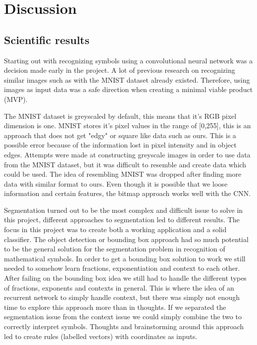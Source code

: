 \chapter{Discussion}

\section{Scientific results}



Starting out with recognizing symbols using a convolutional neural network was a decision made early in the project. A lot of previous research on recognizing similar images such as with the MNIST dataset already existed. Therefore, using images as input data was a safe direction when creating a minimal viable product (MVP).

The MNIST dataset is greyscaled by default, this means that it's RGB pixel dimension is one. MNIST stores it's pixel values in the range of [0,255], this is an approach that does not get "edgy" or square like data such as ours. This is a possible error because of the information lost in pixel intensity and in object edges. Attempts were made at constructing greyscale images in order to use data from the MNIST dataset, but it was difficult to resemble and create data which could be used. The idea of resembling MNIST was dropped after finding more data with similar format to ours. Even though it is possible that we loose information and certain features, the bitmap approach works well with the CNN.

Segmentation turned out to be the most complex and difficult issue to solve in this project, different approaches to segmentation led to different results. The focus in this project was to create both a working application and a solid classifier. The object detection or bounding box approach had so much potential to be the general solution for the segmentation problem in recognition of mathematical symbols. In order to get a bounding box solution to work we still needed to somehow learn fractions, exponentiation and context to each other. After failing on the bounding box idea we still had to handle the different types of fractions, exponents and contexts in general. 
This is where the idea of an recurrent network to simply handle context, but there was simply not enough time to explore this approach more than in thoughts. If we separated the segmentation issue from the context issue we could simply combine the two to correctly interpret symbols. Thoughts and brainstorming around this approach led to create rules (labelled vectors) with coordinates as inputs. %

